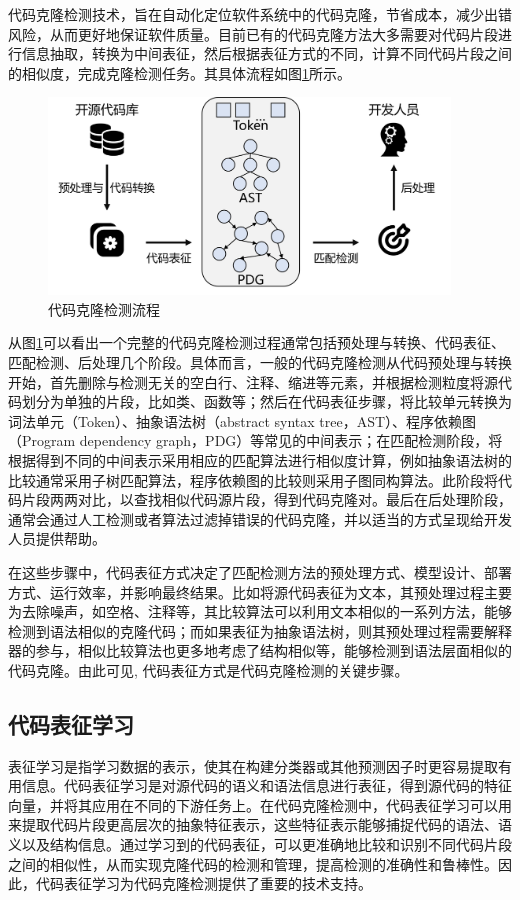 代码克隆检测技术，旨在自动化定位软件系统中的代码克隆，节省成本，减少出错风险，从而更好地保证软件质量。目前已有的代码克隆方法大多需要对代码片段进行信息抽取，转换为中间表征，然后根据表征方式的不同，计算不同代码片段之间的相似度，完成克隆检测任务\cite{9321538}。其具体流程如图\ref{fig:figure1}所示。
\begin{figure}[H]
    \centering
    \includegraphics[width=0.95\textwidth]{figures/figure1}
    \caption{代码克隆检测流程}\label{fig:figure1}
\end{figure}

从图\ref{fig:figure1}可以看出一个完整的代码克隆检测过程通常包括预处理与转换、代码表征、匹配检测、后处理几个阶段。具体而言，一般的代码克隆检测从代码预处理与转换开始，首先删除与检测无关的空白行、注释、缩进等元素，并根据检测粒度将源代码划分为单独的片段，比如类、函数等；然后在代码表征步骤，将比较单元转换为词法单元（Token）、抽象语法树（abstract syntax tree，AST）、程序依赖图（Program dependency graph，PDG）等常见的中间表示；在匹配检测阶段，将根据得到不同的中间表示采用相应的匹配算法进行相似度计算，例如抽象语法树的比较通常采用子树匹配算法，程序依赖图的比较则采用子图同构算法。此阶段将代码片段两两对比，以查找相似代码源片段，得到代码克隆对。最后在后处理阶段，通常会通过人工检测或者算法过滤掉错误的代码克隆，并以适当的方式呈现给开发人员提供帮助。

在这些步骤中，代码表征方式决定了匹配检测方法的预处理方式、模型设计、部署方式、运行效率，并影响最终结果\cite{陈秋远2019代码克隆检测研究进展}。比如将源代码表征为文本，其预处理过程主要为去除噪声，如空格、注释等，其比较算法可以利用文本相似的一系列方法，能够检测到语法相似的克隆代码；而如果表征为抽象语法树，则其预处理过程需要解释器的参与，相似比较算法也更多地考虑了结构相似等，能够检测到语法层面相似的代码克隆。由此可见, 代码表征方式是代码克隆检测的关键步骤。


\subsection{代码表征学习}
\label{subsec:Code representation}
表征学习是指学习数据的表示，使其在构建分类器或其他预测因子时更容易提取有用信息\cite{Bengio2013Representation}。代码表征学习是对源代码的语义和语法信息进行表征，得到源代码的特征向量，并将其应用在不同的下游任务上。在代码克隆检测中，代码表征学习可以用来提取代码片段更高层次的抽象特征表示，这些特征表示能够捕捉代码的语法、语义以及结构信息\cite{liu2023contrabert}。通过学习到的代码表征，可以更准确地比较和识别不同代码片段之间的相似性，从而实现克隆代码的检测和管理，提高检测的准确性和鲁棒性。因此，代码表征学习为代码克隆检测提供了重要的技术支持。


